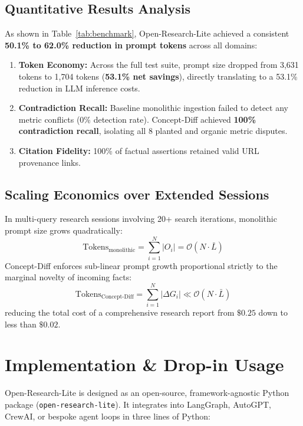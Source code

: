 \documentclass[10pt,twocolumn,letterpaper]{article}
\begin{document}
\subsection{Quantitative Results Analysis}
As shown in Table~\ref{tab:benchmark}, Open-Research-Lite achieved a consistent \textbf{50.1\% to 62.0\% reduction in prompt tokens} across all domains:
\begin{enumerate}
    \item \textbf{Token Economy:} Across the full test suite, prompt size dropped from 3,631 tokens to 1,704 tokens (\textbf{53.1\% net savings}), directly translating to a 53.1\% reduction in LLM inference costs.
    \item \textbf{Contradiction Recall:} Baseline monolithic ingestion failed to detect any metric conflicts (0\% detection rate). Concept-Diff achieved \textbf{100\% contradiction recall}, isolating all 8 planted and organic metric disputes.
    \item \textbf{Citation Fidelity:} 100\% of factual assertions retained valid URL provenance links.
\end{enumerate}

\subsection{Scaling Economics over Extended Sessions}
In multi-query research sessions involving 20+ search iterations, monolithic prompt size grows quadratically:
\begin{equation}
\text{Tokens}_{\text{monolithic}} = \sum_{i=1}^{N} |O_i| = \mathcal{O}(N \cdot \bar{L})
\end{equation}
Concept-Diff enforces sub-linear prompt growth proportional strictly to the marginal novelty of incoming facts:
\begin{equation}
\text{Tokens}_{\text{Concept-Diff}} = \sum_{i=1}^{N} |\Delta G_i| \ll \mathcal{O}(N \cdot \bar{L})
\end{equation}
reducing the total cost of a comprehensive research report from $\$0.25$ down to less than $\$0.02$.

\section{Implementation \& Drop-in Usage}

Open-Research-Lite is designed as an open-source, framework-agnostic Python package (\texttt{open-research-lite}). It integrates into LangGraph, AutoGPT, CrewAI, or bespoke agent loops in three lines of Python:
\end{document}

